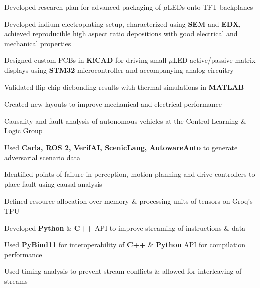 \documentclass[]{chandan-cv}
\begin{document}
\begin{minipage}[t]{0.78\textwidth}
\begin{tightemize}
        \item Developed research plan for advanced packaging of $\mu$LEDs onto TFT backplanes
		\item Developed indium electroplating setup, characterized using \textbf{SEM} and \textbf{EDX}, achieved reproducible high aspect ratio depositions with good electrical and mechanical properties
		\item Designed custom PCBs in \textbf{KiCAD} for driving small $\mu$LED active/passive matrix displays using \textbf{STM32} microcontroller and accompanying analog circuitry
		\item Validated flip-chip diebonding results with thermal simulations in \textbf{MATLAB}
		\item Created new layouts to improve mechanical and electrical performance
\end{tightemize}
\sectionsep

\begin{tightemize}
        \item Causality and fault analysis of autonomous vehicles at the Control Learning \& Logic Group
		\item Used \textbf{Carla, ROS 2, VerifAI, ScenicLang, AutowareAuto} to generate adversarial scenario data
		\item Identified points of failure in perception, motion planning and drive controllers to place fault using causal analysis
\end{tightemize}
\sectionsep

\begin{tightemize}
        \item Defined resource allocation over memory \& processing units of tensors on Groq's TPU
        \item Developed \textbf{Python} \& \textbf{C++} API to improve streaming of instructions \& data
        \item Used \textbf{PyBind11} for interoperability of \textbf{C++} \& \textbf{Python} API for compilation performance
        \item Used timing analysis to prevent stream conflicts \& allowed for interleaving of streams
\end{tightemize}
\sectionsep


\end{minipage}
\end{document}
